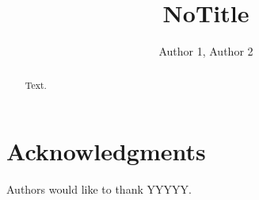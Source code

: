 \documentclass{llncs}
\begin{document}
\title{NoTitle}

\author{Author 1, Author 2}


\maketitle

\begin{abstract}
  Text.
\end{abstract}


















\section*{Acknowledgments}\label{sec:Acknowledgments}

Authors would like to thank YYYYY.

% 







% 
% 
% 
% 
\end{document}
